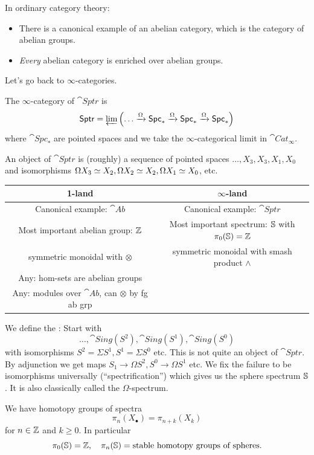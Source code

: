 In ordinary category theory:
\begin{itemize}
	\item There is a canonical example of an abelian category, which is the category of abelian groups.
	\item \emph{Every} abelian category is enriched over abelian groups.
\end{itemize}
Let's go back to $\infty$-categories.
\begin{definition}
	The $\infty$-category of  $\cat{Sptr}$ is
	\[
		\cat{Sptr} = \varprojlim \left( \dots\xrightarrow{\Omega} \cat{Spc}_*
		\xrightarrow{\Omega} \cat{Spc}_*\xrightarrow{\Omega} \cat{Spc}_* \right)
	\]
	where $\cat{Spc}_*$ are pointed spaces and we take the $\infty$-categorical limit in
	$\cat{Cat}_\infty$.
\end{definition}
An object of $\cat{Sptr}$ is (roughly) a sequence of pointed spaces
$\dots,X_3,X_3,X_1,X_0$ and isomorphisms $\Omega X_3\isoto X_2, \Omega X_2\isoto X_2,
\Omega X_1\isoto X_0$, etc.

\begin{table}[h]
	\centering
	\begin{tabular}{c|c}
		1-land & $\infty$-land \\ \hline
		Canonical example: $\cat{Ab}$ & Canonical example: $\cat{Sptr}$ \\
		Most important abelian group: $\Z$ & Most important spectrum: $\S$ with $\pi_0(\S)=\Z$ \\
		symmetric monoidal with $\otimes$ & symmetric monoidal with smash product $\wedge$ \\
		Any: hom-sets are abelian groups & \\
		Any: modules over $\cat{Ab}$, can $\otimes$ by fg ab grp
	\end{tabular}
\end{table}

We define the : Start with
\[
	\dots, \cat{Sing}(S^2), \cat{Sing}(S^{1}), \cat{Sing}(S^{0})
\]
with isomorphisms $S^2=\Sigma S^{1}, S^{1}=\Sigma S^{0}$ etc. This is not quite an object
of $\cat{Sptr}$. By adjunction we get maps $S_1\to \Omega S^2, S^0\to \Omega S^{1}$ etc.
We fix the failure to be isomorphisms universally (``spectrification'') which gives us
the sphere spectrum $\S$. It is also classically called the $\Omega$-spectrum.

We have homotopy groups of spectra
\[
	\pi_n (X_\bullet) = \pi_{n+k}(X_k)
\]
for $n\in \Z$ and $k\ge 0$. In particular
\[
	\pi_0(\S) = \Z,\quad \pi_n(\S) = \text{stable homotopy groups of spheres}.
\]


